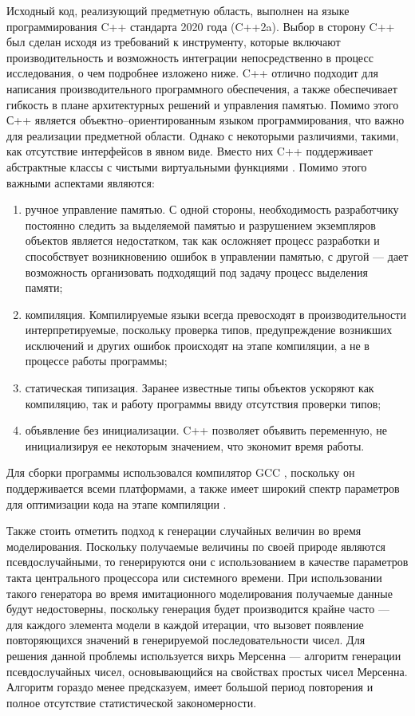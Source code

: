  Исходный код, реализующий предметную область, выполнен на языке программирования C++ стандарта 2020 года (C++2a). Выбор в сторону C++ был сделан исходя из требований к инструменту, которые включают производительность и возможность интеграции непосредственно в процесс исследования, о чем подробнее изложено ниже. C++ отлично подходит для написания производительного программного обеспечения, а также обеспечивает гибкость в плане архитектурных решений и управления памятью. Помимо этого С++ является объектно--ориентированным языком программирования, что важно для реализации предметной области. Однако с некоторыми различиями, такими, как отсутствие интерфейсов в явном виде. Вместо них C++ поддерживает абстрактные классы с чистыми виртуальными функциями \cite{schmid2012c++}.
 Помимо этого важными аспектами являются:
 \begin{enumerate}
 	\item ручное управление памятью. С одной стороны, необходимость разработчику постоянно следить за выделяемой памятью и разрушением экземпляров объектов является недостатком, так как осложняет процесс разработки и способствует возникновению ошибок в управлении памятью, с другой --- дает возможность организовать подходящий под задачу процесс выделения памяти;
 	\item компиляция. Компилируемые языки всегда превосходят в производительности интерпретируемые, поскольку проверка типов, предупреждение возникших исключений и других ошибок происходят на этапе компиляции, а не в процессе работы программы;
 	\item статическая типизация. Заранее известные типы объектов ускоряют как компиляцию, так и работу программы ввиду отсутствия проверки типов;
 	\item объявление без инициализации. C++ позволяет объявить переменную, не инициализируя ее некоторым значением, что экономит время работы.
 \end{enumerate}

 Для сборки программы использовался компилятор GCC \cite{gcc}, поскольку он поддерживается всеми платформами, а также имеет широкий спектр параметров для оптимизации кода на этапе компиляции \cite{branco2015impact}. 
 
 Также стоить отметить подход к генерации случайных величин во время моделирования. Поскольку получаемые величины по своей природе являются псевдослучайными, то генерируются они с использованием в качестве параметров такта центрального процессора или системного времени. При использовании такого генератора во время имитационного моделирования получаемые данные будут недостоверны, поскольку генерация будет производится крайне часто --- для каждого элемента модели в каждой итерации, что вызовет появление повторяющихся значений в генерируемой последовательности чисел. Для решения данной проблемы используется вихрь Мерсенна \cite{matsumoto1998mersenne} --- алгоритм генерации псевдослучайных чисел, основывающийся на свойствах простых чисел Мерсенна. Алгоритм гораздо менее предсказуем, имеет большой период повторения и полное отсутствие статистической закономерности. 
 
